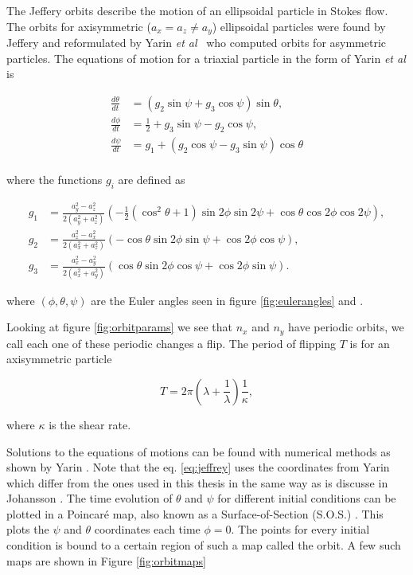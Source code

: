 \label{sec:jeffery}
The Jeffery orbits describe the motion of an ellipsoidal particle in Stokes flow. The orbits for axisymmetric ($a_x = a_z \ne a_y$) ellipsoidal particles were found by Jeffery and reformulated by Yarin \emph{et al}~\cite{Yarin} who computed orbits for asymmetric particles. The equations of motion for a triaxial particle in the form of Yarin \emph{et al} is

\begin{subequations}\label{eq:jeffrey}
\begin{align}
\frac{d\theta}{dt} 	&= (g_2 \sin \psi + g_3 \cos \psi ) \sin \theta, \\
\frac{d\phi}{dt} 	&= \tfrac{1}{2} + g_3\sin \psi - g_2 \cos \psi,\\
\frac{d\psi}{dt}	&= g_1 + (g_2\cos \psi - g_3\sin \psi) \cos \theta \\
\end{align}
\end{subequations}

where the functions  $g_i$ are defined as

\begin{subequations}
\begin{align}
g_1 &= \frac{a_y^2 - a_z^2}{2(a_y^2 + a_z^2)} 
		\left(-\tfrac{1}{2}(\cos^2 \theta + 1 )\sin 2\phi \sin 2\psi + \cos\theta \cos 2\phi \cos 2\psi \right), \\
g_2 &= \frac{a_z^2 - a_x^2}{2(a_x^2 + a_z^2)}
		\left( -\cos\theta \sin 2\phi \sin\psi  +  \cos 2\phi \cos\psi \right), \\
g_3 &= \frac{a_x^2 - a_y^2}{2(a_x^2 + a_y^2)}
		\left( \cos\theta \sin 2\phi \cos\psi + \cos 2\phi \sin\psi \right).
\end{align}
\end{subequations}

where $(\phi, \theta, \psi)$ are the Euler angles seen in figure \ref{fig:eulerangles} and . 

Looking at figure \ref{fig:orbitparams} we see that $n_x$ and $n_y$ have periodic orbits, we call each one of these periodic changes a flip. The period of flipping $T$ is for an axisymmetric particle \cite{Jeffery}

\begin{equation}\label{eq:flipRate}
T = 2\pi \left( \lambda + \frac{1}{\lambda} \right)\frac{1}{\kappa},
\end{equation}

\noindent where $\kappa$ is the shear rate. 

Solutions to the equations of motions can be found with numerical methods as shown by Yarin \cite{Yarin}. Note that the eq. \ref{eq:jeffrey} uses the coordinates from Yarin which differ from the ones used in this thesis in the same way as is discusse in Johansson \cite{AntonThesis}. The time evolution of $\theta$ and $\psi$ for different initial conditions can be plotted in a Poincaré map, also known 
as a Surface-of-Section (S.O.S.) \cite{poincare}. This plots the $\psi$ and $\theta$ coordinates each time $\phi = 0$. The points for every initial condition is bound to a certain region of such a map called the orbit. A few such maps are shown in Figure \ref{fig:orbitmaps}

